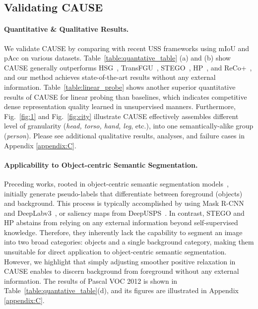 \documentclass{article} \usepackage{iclr2024_conference,times}
\begin{document}
\subsection{Validating CAUSE}
\vspace{-1mm}
\paragraph{Quantitative \& Qualitative Results.} We validate CAUSE by comparing with recent USS frameworks using mIoU and pAcc on various datasets. Table~\ref{table:quantative_table} (a) and (b) show CAUSE generally outperforms HSG~\citep{ke2022unsupervised}, TransFGU~\citep{yin2022transfgu}, STEGO~\citep{hamilton2022unsupervised}, HP~\citep{seong2023leveraging}, and ReCo+~\citep{shin2022reco}, and our method achieves state-of-the-art results without any external information. Table~\ref{table:linear_probe} shows another superior quantitative results of CAUSE for linear probing than baselines, which indicates competitive dense representation quality learned in unsupervised manners. Furthermore, Fig.~\ref{fig:1} and Fig.~\ref{fig:city} illustrate CAUSE effectively assembles different level of granularity (\textit{head, torso, hand, leg}, etc.), into one semantically-alike group (\textit{person}). Please see additional qualitative results, analyses, and failure cases in Appendix \ref{appendix:C}.

\paragraph{Applicability to Object-centric Semantic Segmentation.} Preceding works, rooted in object-centric semantic segmentation models~\citep{van2021unsupervised, yin2022transfgu, zadaianchuk2023unsupervised}, initially generate pseudo-labels that differentiate between foreground (objects) and background. This process is typically accomplished by using Mask R-CNN~\citep{he2017mask} and DeepLabv3~\citep{chen2017rethinking}, or saliency maps from DeepUSPS~\citep{nguyen2019deepusps}. In contrast, STEGO and HP abstains from relying on any external information beyond self-supervised knowledge. Therefore, they inherently lack the capability to segment an image into two broad categories: objects and a single background category, making them unsuitable for direct application to object-centric semantic segmentation. However, we highlight that simply adjusting smoother positive relaxation in CAUSE enables to discern background from foreground without any external information. The results of Pascal VOC 2012 is shown in Table~\ref{table:quantative_table}(d), and its figures are illustrated in Appendix \ref{appendix:C}.
\end{document}
